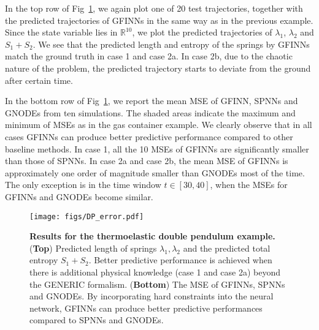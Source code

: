 \documentclass[openacc]{rsproca_new}%
\begin{document}
In the top row of Fig~\ref{fig:DP_error}, we again plot one of 20 test trajectories, together with the predicted trajectories of GFINNs in the same way as in the previous example. Since the state variable lies in $\mathbb{R}^{10}$, we plot the predicted trajectories of $\lambda_1$, $\lambda_2$ and $S_1 + S_2$. We see that the predicted length and entropy of the springs by GFINNs match the ground truth in case 1 and case 2a. In case 2b, due to the chaotic nature of the problem, the predicted trajectory starts to deviate from the ground after certain time.

In the bottom row of Fig~\ref{fig:DP_error}, we report the mean MSE of GFINN, SPNNs and GNODEs from ten simulations.
The shaded areas indicate
the maximum and minimum of MSEs 
as in the gas container example. We clearly observe that in all cases GFINNs can produce better predictive performance compared to other baseline methods. In case 1, all the 10 MSEs of GFINNs are significantly smaller than those of SPNNs. In case 2a and case 2b, the mean MSE of GFINNs is approximately one order of magnitude smaller than GNODEs most of the time. The only exception is in the time window $t\in[30,40]$, when the MSEs for GFINNs and GNODEs become similar. 

\begin{figure}[ht]
    \centering
    \texttt{[image: figs/DP\_error.pdf]}
    \caption{\textbf{Results for the thermoelastic double pendulum example.} (\textbf{Top}) Predicted length of springs $\lambda_1,\lambda_2$ and the predicted total entropy $S_1 + S_2$. Better predictive performance is achieved when there is additional physical knowledge (case 1 and case 2a) beyond the GENERIC formalism. (\textbf{Bottom}) The MSE of GFINNs, SPNNs and GNODEs. By incorporating hard constraints into the neural network, GFINNs can produce better predictive performances compared to SPNNs and GNODEs.}
    \label{fig:DP_error}
\end{figure}
\end{document}
